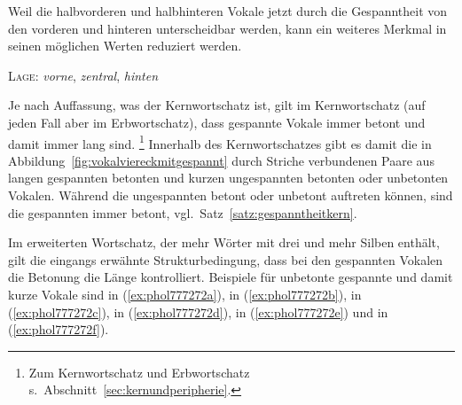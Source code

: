 Weil die halbvorderen und halbhinteren Vokale jetzt durch die Gespanntheit von den vorderen und hinteren unterscheidbar werden, kann ein weiteres Merkmal in seinen möglichen Werten reduziert werden.

\begin{exe}
  \ex \textsc{Lage}: \textit{vorne}, \textit{zentral}, \textit{hinten}
\end{exe}

Je nach Auffassung, was der Kernwortschatz ist, gilt im Kernwortschatz (auf jeden Fall aber im Erbwortschatz), dass gespannte Vokale immer betont und damit immer lang sind.%
\footnote{Zum Kernwortschatz und Erbwortschatz s.\ Abschnitt~\ref{sec:kernundperipherie}.}
Innerhalb des Kernwortschatzes gibt es damit die in Abbildung~\ref{fig:vokalviereckmitgespannt} durch Striche verbundenen Paare aus langen gespannten betonten und kurzen ungespannten betonten oder unbetonten Vokalen.
Während die ungespannten betont oder unbetont auftreten können, sind die gespannten immer betont, vgl.\ Satz~\ref{satz:gespanntheitkern}.


Im erweiterten Wortschatz, der mehr Wörter mit drei und mehr Silben enthält, gilt die eingangs erwähnte Strukturbedingung, dass bei den gespannten Vokalen die Betonung die Länge kontrolliert.
Beispiele für unbetonte gespannte und damit kurze Vokale sind \textipa{[i]} in (\ref{ex:phol777272a}), \textipa{[e]} in (\ref{ex:phol777272b}), \textipa{[u]} in (\ref{ex:phol777272c}), \textipa{[o]} in (\ref{ex:phol777272d}), \textipa{[\o]} in (\ref{ex:phol777272e}) und \textipa{[y]} in (\ref{ex:phol777272f}).

